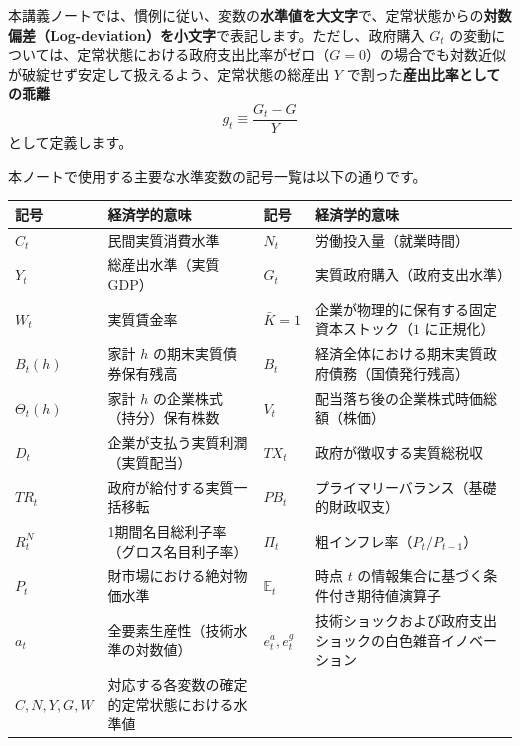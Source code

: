 \documentclass[
  japanese,
  lualatex,
  ja=standard,
  12pt,
  a4paper]{ltjsarticle}
\newcounter{none} %
\begin{document}
本講義ノートでは、慣例に従い、変数の\textbf{水準値を大文字}で、定常状態からの\textbf{対数偏差（Log-deviation）を小文字}で表記します。ただし、政府購入
\(G_t\)
の変動については、定常状態における政府支出比率がゼロ（\(G=0\)）の場合でも対数近似が破綻せず安定して扱えるよう、定常状態の総産出
\(Y\) で割った\textbf{産出比率としての乖離} \[
g_t \equiv \frac{G_t - G}{Y}
\] として定義します。

本ノートで使用する主要な水準変数の記号一覧は以下の通りです。

{\def\LTcaptype{none} %
\begin{longtable}[]{@{}
  >{\raggedright\arraybackslash}p{}
  >{\raggedright\arraybackslash}p{}
  >{\raggedright\arraybackslash}p{}
  >{\raggedright\arraybackslash}p{}@{}}
\toprule\noalign{}
\begin{minipage}[b]{\linewidth}\raggedright
記号
\end{minipage} & \begin{minipage}[b]{\linewidth}\raggedright
経済学的意味
\end{minipage} & \begin{minipage}[b]{\linewidth}\raggedright
記号
\end{minipage} & \begin{minipage}[b]{\linewidth}\raggedright
経済学的意味
\end{minipage} \\
\midrule\noalign{}
\endhead
\bottomrule\noalign{}
\endlastfoot
\(C_t\) & 民間実質消費水準 & \(N_t\) & 労働投入量（就業時間） \\
\(Y_t\) & 総産出水準（実質GDP） & \(G_t\) &
実質政府購入（政府支出水準） \\
\(W_t\) & 実質賃金率 & \(\bar{K}=1\) &
企業が物理的に保有する固定資本ストック（\(1\) に正規化） \\
\(B_t(h)\) & 家計 \(h\) の期末実質債券保有残高 & \(B_t\) &
経済全体における期末実質政府債務（国債発行残高） \\
\(\Theta_t(h)\) & 家計 \(h\) の企業株式（持分）保有株数 & \(V_t\) &
配当落ち後の企業株式時価総額（株価） \\
\(D_t\) & 企業が支払う実質利潤（実質配当） & \(TX_t\) &
政府が徴収する実質総税収 \\
\(TR_t\) & 政府が給付する実質一括移転 & \(PB_t\) &
プライマリーバランス（基礎的財政収支） \\
\(R_t^N\) & 1期間名目総利子率（グロス名目利子率） & \(\Pi_t\) &
粗インフレ率（\(P_t/P_{t-1}\)） \\
\(P_t\) & 財市場における絶対物価水準 & \(\mathbb{E}_t\) & 時点 \(t\)
の情報集合に基づく条件付き期待値演算子 \\
\(a_t\) & 全要素生産性（技術水準の対数値） & \(e_t^a, e_t^g\) &
技術ショックおよび政府支出ショックの白色雑音イノベーション \\
\(C, N, Y, G, W\) & 対応する各変数の確定的定常状態における水準値 & & \\
\end{longtable}
}
\end{document}
